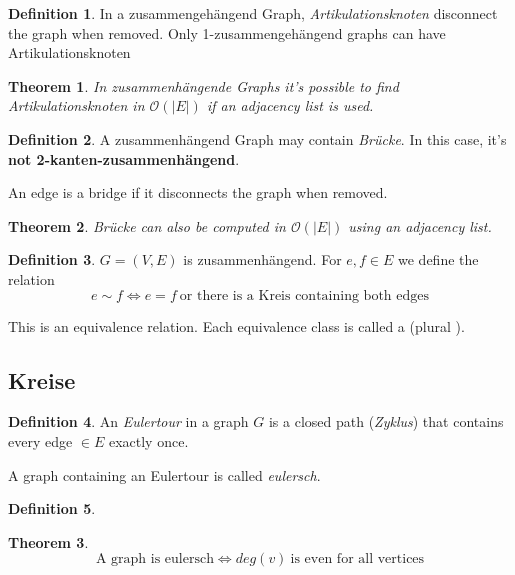 \documentclass[12pt]{extarticle}
\theoremstyle{definition}
\newtheorem{definition}{Definition}
\theoremstyle{remark}
\theoremstyle{plain}
\newtheorem{theorem}{Theorem}
\newcommand{\BO}{\mathcal{O}}
\begin{document}
\begin{definition}
    In a zusammengehängend Graph,
    \textit{Artikulationsknoten} disconnect the graph when removed.
    Only 1-zusammengehängend graphs can have Artikulationsknoten
\end{definition}

\begin{theorem}
    In zusammenhängende Graphs it's possible to find Artikulationsknoten in $\BO(|E|)$ if an adjacency list is used.
\end{theorem}

\begin{definition}
    A zusammenhängend Graph may contain \textit{Brücke}. In this case, it's \textbf{not 2-kanten-zusammenhängend}.

    An edge is a bridge if it disconnects the graph when removed.
\end{definition}

\begin{theorem}
    Brücke can also be computed in $\BO(|E|)$ using an adjacency list.
\end{theorem}

\begin{definition}
    $G = (V,E)$ is zusammenhängend. For $e,f \in E$ we define the relation
    \[ e \sim f \Leftrightarrow e = f\ \mbox{or there is a Kreis containing both edges} \]

    This is an equivalence relation. Each equivalence class is called a  (plural ).
\end{definition}

\subsection{Kreise}

\begin{definition}
    An \textit{Eulertour} in a graph $G$ is a closed path (\textit{Zyklus}) that contains every edge $\in E$ exactly once.

    A graph containing an Eulertour is called \textit{eulersch}.
\end{definition}

\begin{definition}

\end{definition}

\begin{theorem}
    \[ \mbox{A graph is eulersch} \Leftrightarrow deg(v)\ \mbox{is even for all vertices}\]
\end{theorem}
\end{document}
